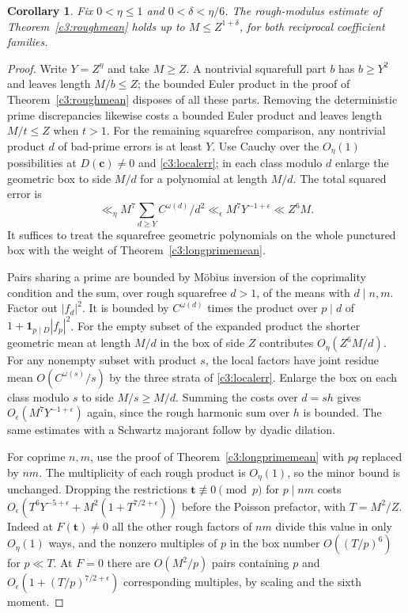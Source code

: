 \documentclass[11pt,letterpaper]{article}
\newtheorem{corollary}[corollary]{Corollary}
\theoremstyle{definition}
\begin{document}
\begin{corollary}\label{c3:longrough}
Fix $0<\eta\le1$ and $0<\delta<\eta/6$. The rough-modulus
estimate of Theorem~\ref{c3:roughmean} holds up to $M\le
Z^{1+\delta}$, for both reciprocal coefficient families.
\end{corollary}
\begin{proof}
Write $Y=Z^\eta$ and take $M\ge Z$. A nontrivial squarefull part
$b$ has $b\ge Y^2$ and leaves length $M/b\le Z$; the bounded Euler
product in the proof of Theorem~\ref{c3:roughmean} disposes of all
these parts. Removing the deterministic prime discrepancies likewise
costs a bounded Euler product and leaves length $M/t\le Z$ when
$t>1$. For the remaining squarefree comparison, any nontrivial
product $d$ of bad-prime errors is at least $Y$. Use Cauchy over
the $O_\eta(1)$ possibilities at $D(\mathbf c)\ne0$ and
\eqref{c3:localerr}; in each class modulo $d$ enlarge the geometric
box to side $M/d$ for a polynomial at length $M/d$.
The total squared error is
\[
 \ll_\eta M^7\sum_{d\ge Y} C^{\omega(d)}/d^2
       \ll_\epsilon M^7 Y^{-1+\epsilon}\ll Z^6 M.
\]
It suffices to treat the squarefree geometric polynomials on the
whole punctured box with the weight of Theorem~\ref{c3:longprimemean}.

Pairs sharing a prime are bounded by M\"obius inversion of the
coprimality condition and the sum, over rough squarefree $d>1$,
of the means with $d\mid n,m$. Factor out $|f_d|^2$. It is
bounded by $C^{\omega(d)}$ times the product over $p\mid d$ of
$1+\mathbf1_{p\mid D}|f_p|^2$. For the empty subset of the
expanded product the shorter geometric mean at length $M/d$ in
the box of side $Z$ contributes $O_\eta(Z^6M/d)$.
For any nonempty subset with product $s$, the local factors have
joint residue mean $O(C^{\omega(s)}/s)$ by the three strata of
\eqref{c3:localerr}. Enlarge the box on each class modulo $s$
to side $M/s\ge M/d$. Summing the costs over $d=sh$ gives
$O_\epsilon(M^7Y^{-1+\epsilon})$ again, since the rough
harmonic sum over $h$ is bounded. The same estimates with a
Schwartz majorant follow by dyadic dilation.

For coprime $n,m$, use the proof of Theorem~\ref{c3:longprimemean}
with $pq$ replaced by $nm$. The multiplicity of each rough product
is $O_\eta(1)$, so the minor bound is unchanged. Dropping the
restrictions $\mathbf t\not\equiv0\pmod p$ for $p\mid nm$ costs
$O_\epsilon(T^6Y^{-5+\epsilon}+M^2(1+T^{7/2+\epsilon}))$
before the Poisson prefactor, with $T=M^2/Z$. Indeed at
$F(\mathbf t)\ne0$ all the other rough factors of $nm$ divide
this value in only $O_\eta(1)$ ways, and the nonzero multiples
of $p$ in the box number $O((T/p)^6)$ for $p\ll T$.
At $F=0$ there are $O(M^2/p)$ pairs containing $p$ and
$O_\epsilon(1+(T/p)^{7/2+\epsilon})$ corresponding multiples,
by scaling and the sixth moment.


\end{proof}
\end{document}
